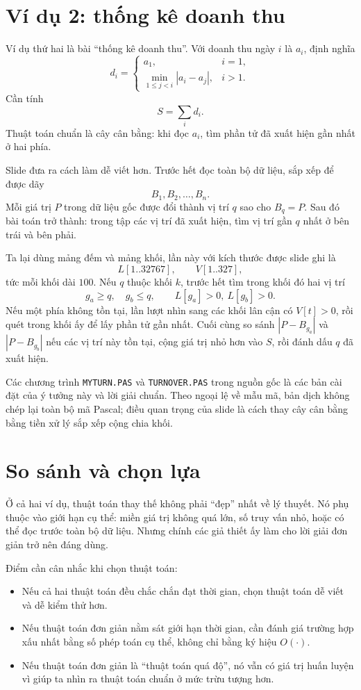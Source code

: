 \documentclass[11pt]{article}
\begin{document}
\section{Ví dụ 2: thống kê doanh thu}

Ví dụ thứ hai là bài ``thống kê doanh thu''. Với doanh thu ngày \(i\) là
\(a_i\), định nghĩa
\[
  d_i =
  \begin{cases}
    a_1, & i=1,\\
    \min\limits_{1\le j<i}|a_i-a_j|, & i>1.
  \end{cases}
\]
Cần tính
\[
  S=\sum_i d_i.
\]
Thuật toán chuẩn là cây cân bằng: khi đọc \(a_i\), tìm phần tử đã xuất hiện
gần nhất ở hai phía.

Slide đưa ra cách làm dễ viết hơn. Trước hết đọc toàn bộ dữ liệu, sắp xếp để
được dãy
\[
  B_1,B_2,\ldots,B_n.
\]
Mỗi giá trị \(P\) trong dữ liệu gốc được đổi thành vị trí \(q\) sao cho
\(B_q=P\). Sau đó bài toán trở thành: trong tập các vị trí đã xuất hiện, tìm
vị trí gần \(q\) nhất ở bên trái và bên phải.

Ta lại dùng mảng đếm và mảng khối, lần này với kích thước được slide ghi là
\[
  L[1..32767],\qquad V[1..327],
\]
tức mỗi khối dài \(100\). Nếu \(q\) thuộc khối \(k\), trước hết tìm trong
khối đó hai vị trí
\[
  g_a\ge q,\quad g_b\le q,\qquad L[g_a]>0,\ L[g_b]>0.
\]
Nếu một phía không tồn tại, lần lượt nhìn sang các khối lân cận có
\(V[t]>0\), rồi quét trong khối ấy để lấy phần tử gần nhất. Cuối cùng so sánh
\(|P-B_{g_a}|\) và \(|P-B_{g_b}|\) nếu các vị trí này tồn tại, cộng giá trị
nhỏ hơn vào \(S\), rồi đánh dấu \(q\) đã xuất hiện.

Các chương trình \texttt{MYTURN.PAS} và \texttt{TURNOVER.PAS} trong nguồn gốc
là các bản cài đặt của ý tưởng này và lời giải chuẩn. Theo ngoại lệ về mẫu mã,
bản dịch không chép lại toàn bộ mã Pascal; điều quan trọng của slide là cách
thay cây cân bằng bằng tiền xử lý sắp xếp cộng chia khối.

\section{So sánh và chọn lựa}

Ở cả hai ví dụ, thuật toán thay thế không phải ``đẹp'' nhất về lý thuyết. Nó
phụ thuộc vào giới hạn cụ thể: miền giá trị không quá lớn, số truy vấn nhỏ,
hoặc có thể đọc trước toàn bộ dữ liệu. Nhưng chính các giả thiết ấy làm cho
lời giải đơn giản trở nên đáng dùng.

Điểm cần cân nhắc khi chọn thuật toán:
\begin{itemize}
  \item Nếu cả hai thuật toán đều chắc chắn đạt thời gian, chọn thuật toán dễ
        viết và dễ kiểm thử hơn.
  \item Nếu thuật toán đơn giản nằm sát giới hạn thời gian, cần đánh giá
        trường hợp xấu nhất bằng số phép toán cụ thể, không chỉ bằng ký hiệu
        \(O(\cdot)\).
  \item Nếu thuật toán đơn giản là ``thuật toán quá độ'', nó vẫn có giá trị
        huấn luyện vì giúp ta nhìn ra thuật toán chuẩn ở mức trừu tượng hơn.
\end{itemize}
\end{document}
